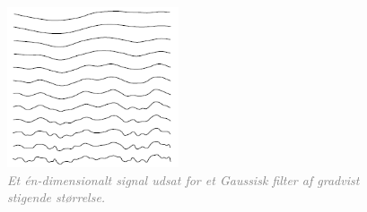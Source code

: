 \begin{figure}[H]
    \centering
    \includegraphics[width=0.45\textwidth]{fig/33.png}
     \vspace{-1em}
    \begin{center}    
       \caption{\textcolor{gray}{\footnotesize \textit{Et én-dimensionalt signal udsat for et Gaussisk filter af gradvist stigende størrelse.}}}
    \label{fig:scalereps}
     \end{center}
     \vspace{-2.5em}
  \end{figure} \noindent
